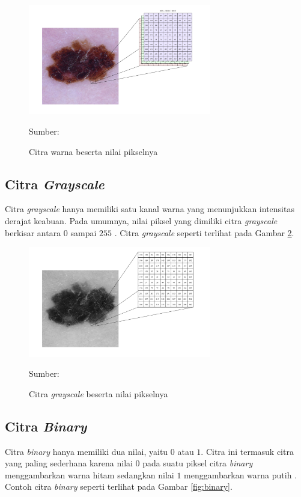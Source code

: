     \begin{figure}[H]
        \begin{center}
            \includegraphics[width=8cm]{../img/Citra Warna - Latex.png}
            \caption{Citra warna beserta nilai pikselnya}
            \label{fig:color}
            Sumber: \citep{Kusumanto2011}
        \end{center}
    \end{figure}

    \subsection{Citra \textit{Grayscale}}
    Citra \textit{grayscale} hanya memiliki satu kanal warna yang menunjukkan intensitas derajat keabuan. Pada umumnya, nilai piksel yang dimiliki citra \textit{grayscale} berkisar antara $0$ sampai $255$ \citep{Kusumanto2011}. Citra \textit{grayscale} seperti terlihat pada Gambar \ref{fig:grayscale}.

    \begin{figure}[H]
        \begin{center}
            \includegraphics[width=8cm]{../img/Citra Grayscale - Latex.png}
            \caption{Citra \textit{grayscale} beserta nilai pikselnya}
            \label{fig:grayscale}
            Sumber: \citep{Kusumanto2011}
        \end{center}
    \end{figure}

    \subsection{Citra \textit{Binary}}
    Citra \textit{binary} hanya memiliki dua nilai, yaitu $0$ atau $1$. Citra ini termasuk citra yang paling sederhana karena nilai $0$ pada suatu piksel citra \textit{binary} menggambarkan warna hitam sedangkan nilai $1$ menggambarkan warna putih \citep{Kusumanto2011}. Contoh citra \textit{binary} seperti terlihat pada Gambar \ref{fig:binary}.

